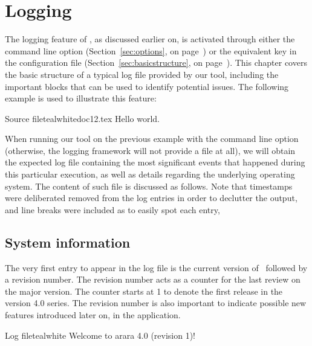 \chapter{Logging}
\label{chap:logging}

The logging feature of \arara, as discussed earlier on, is activated through either the  command line option (Section~\ref{sec:options}, on page~\pageref{sec:options}) or the equivalent key in the configuration file (Section~\ref{sec:basicstructure}, on page~\pageref{sec:basicstructure}). This chapter covers the basic structure of a typical log file provided by our tool, including the important blocks that can be used to identify potential issues. The following example is used to illustrate this feature:

\begin{ncodebox}{Source file}{teal}{\icnote}{white}{doc12.tex}
Hello world.
\bye
\end{ncodebox}

When running our tool on the previous example with the  command line option (otherwise, the logging framework will not provide a file at all), we will obtain the expected  log file containing the most significant events that happened during this particular execution, as well as details regarding the underlying operating system. The content of such file is discussed as follows. Note that timestamps were deliberated removed from the log entries in order to declutter the output, and line breaks were included as to easily spot each entry,

\section{System information}
\label{sec:systeminformation}

The very first entry to appear in the log file is the current version of \arara\ followed by a revision number. The revision number acts as a counter for the last review on the major version. The counter starts at 1 to denote the first release in the version 4.0 series. The revision number is also important to indicate possible new features introduced later on, in the application.

\begin{codebox}{Log file}{teal}{\icnote}{white}
Welcome to arara 4.0 (revision 1)!
\end{codebox}

